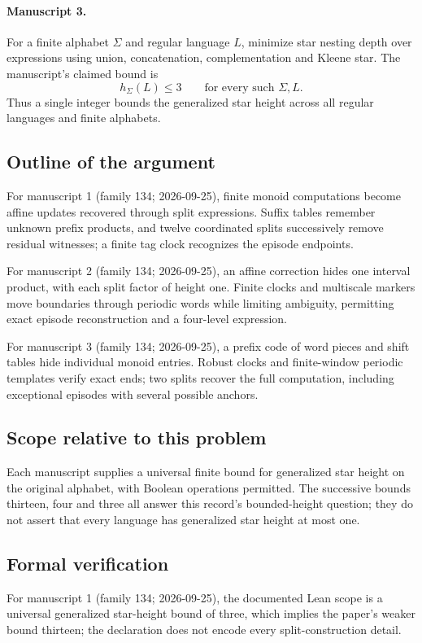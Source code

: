 \documentclass[11pt]{article}
\begin{document}
\paragraph{Manuscript 3.}
For a finite alphabet $\Sigma$ and regular language $L$, minimize star nesting depth over expressions using union, concatenation, complementation and Kleene star. The manuscript's claimed bound is
\[
 h_{\Sigma}(L)\le3\qquad\text{for every such }\Sigma,L.
\]
Thus a single integer bounds the generalized star height across all regular languages and finite alphabets.

\subsection{Outline of the argument}
For manuscript 1 (family 134; 2026-09-25), finite monoid computations become affine updates recovered through split expressions. Suffix tables remember unknown prefix products, and twelve coordinated splits successively remove residual witnesses; a finite tag clock recognizes the episode endpoints.

For manuscript 2 (family 134; 2026-09-25), an affine correction hides one interval product, with each split factor of height one. Finite clocks and multiscale markers move boundaries through periodic words while limiting ambiguity, permitting exact episode reconstruction and a four-level expression.

For manuscript 3 (family 134; 2026-09-25), a prefix code of word pieces and shift tables hide individual monoid entries. Robust clocks and finite-window periodic templates verify exact ends; two splits recover the full computation, including exceptional episodes with several possible anchors.

\subsection{Scope relative to this problem}
Each manuscript supplies a universal finite bound for generalized star height on the original alphabet, with Boolean operations permitted. The successive bounds thirteen, four and three all answer this record's bounded-height question; they do not assert that every language has generalized star height at most one.

\subsection{Formal verification}
For manuscript 1 (family 134; 2026-09-25), the documented Lean scope is a universal generalized star-height bound of three, which implies the paper's weaker bound thirteen; the declaration does not encode every split-construction detail.
\end{document}

